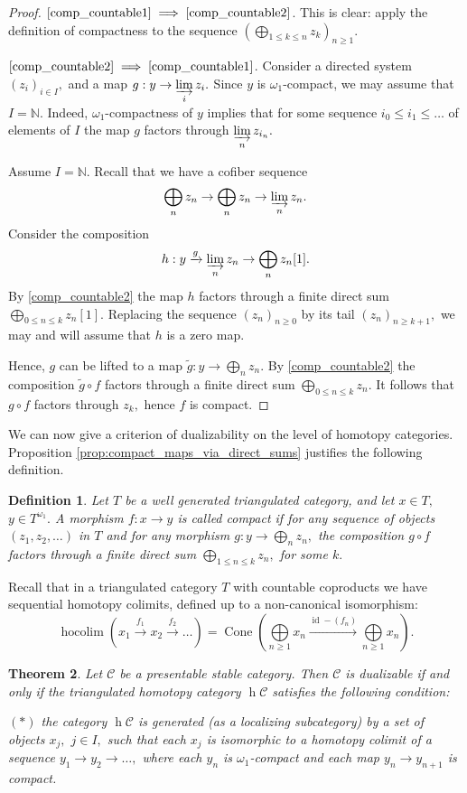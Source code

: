 \documentclass[11pt,leqno]{amsart}
\newcommand{\Implies}[2]{$\text{\ref{#1}}\implies\text{\ref{#2}}$}
\newtheorem{theo}{Theorem}[section]
\newtheorem{defi}[theo]{Definition}
\numberwithin{equation}{section}
\def\N{\mathbb{N}}
\def\wt{\widetilde}
\def\h{\operatorname{h}}
\DeclareMathOperator*{\hocolim}{hocolim}
\newcommand{\indlim}[1][]{\mathop{\varinjlim}\limits_{#1}}
\newcommand{\biggplus}[1][]{\mathop{\bigoplus}\limits_{#1}}
\newcommand{\xto}{\xrightarrow}
\newcommand{\Cone}{\operatorname{Cone}}
\newcommand{\cC}{{\mathcal C}}
\newcommand{\id}{\operatorname{id}}
\begin{document}
\begin{proof}\Implies{comp_countable1}{comp_countable2}. This is clear: apply the definition of compactness to the sequence $(\biggplus[1\leq k\leq n]z_k)_{n\geq 1}.$

\Implies{comp_countable2}{comp_countable1}. Consider a directed system $(z_i)_{i\in I},$ and a map $g:y\to\indlim[i]z_i.$ Since $y$ is $\omega_1$-compact, we may assume that $I=\N.$ Indeed, $\omega_1$-compactness of $y$ implies that for some sequence $i_0\leq i_1\leq\dots$ of elements of $I$ the map $g$ factors through $\indlim[n]z_{i_n}.$

Assume $I=\N.$ Recall that we have a cofiber sequence
$$\biggplus[n]z_n\to\biggplus[n]z_n\to\indlim[n]z_n.$$ Consider the composition 
$$h:y\xto{g}\indlim[n]z_n\to\biggplus[n]z_n[1].$$
By \ref{comp_countable2} the map $h$ factors through a finite direct sum $\biggplus[0\leq n\leq k]z_n[1].$ Replacing the sequence $(z_n)_{n\geq 0}$ by its tail $(z_n)_{n\geq k+1},$ we may and will assume that $h$ is a zero map.

Hence, $g$ can be lifted to a map $\wt{g}:y\to\biggplus[n]z_n.$ By \ref{comp_countable2} the composition $\wt{g}\circ f$ factors through a finite direct sum $\biggplus[0\leq n\leq k]z_n.$ It follows that $g\circ f$ factors through $z_k,$ hence $f$ is compact.   
\end{proof}

We can now give a criterion of dualizability on the level of homotopy categories. Proposition \ref{prop:compact_maps_via_direct_sums} justifies the following definition.

\begin{defi}Let $T$ be a well generated triangulated category, and let $x\in T,$ $y\in T^{\omega_1}.$ A morphism $f:x\to y$ is called compact if for any sequence of objects $(z_1,z_2,\dots)$ in $T$ and for any morphism $g:y\to \biggplus[n] z_n,$ the composition $g\circ f$ factors through a finite direct sum $\biggplus[1\leq n\leq k]z_n,$ for some $k.$\end{defi}

 Recall that in a triangulated category $T$ with countable coproducts we have sequential homotopy colimits, defined up to a non-canonical isomorphism:
$$\hocolim(x_1\xto{f_1} x_2\xto{f_2}\dots)=\Cone(\biggplus[n\geq 1] x_n\xto{\id-(f_n)} \biggplus[n\geq 1] x_n).$$

\begin{theo}\label{th:dualizability_via_compact_maps} Let $\cC$ be a presentable stable category. Then $\cC$ is dualizable if and only if the triangulated homotopy category $\h\cC$ satisfies the following condition:

$(*)$ the category $\h\cC$ is generated (as a localizing subcategory) by a set of objects $x_j,$ $j\in I,$ such that each $x_j$ is isomorphic to a homotopy colimit of a sequence $y_1\to y_2\to\dots,$ where each $y_n$ is $\omega_1$-compact and each map $y_n\to y_{n+1}$ is compact. 
\end{theo}
\end{document}
